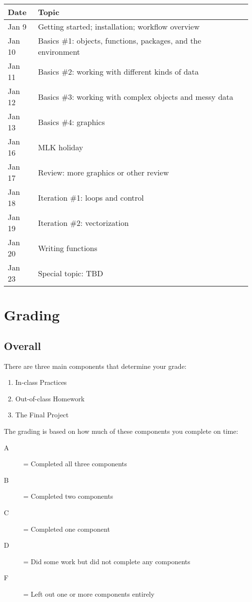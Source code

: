 \documentclass{tufte-handout}
\begin{document}
\begin{center}
\begin{tabular}{ll}
Date & Topic\\
\hline
Jan 9 & Getting started; installation; workflow overview\\
Jan 10 & Basics \#1: objects, functions, packages, and the environment\\
Jan 11 & Basics \#2: working with different kinds of data\\
Jan 12 & Basics \#3: working with complex objects and messy data\\
Jan 13 & Basics \#4: graphics\\
Jan 16 & MLK holiday\\
Jan 17 & Review: more graphics or other review\\
Jan 18 & Iteration \#1: loops and control\\
Jan 19 & Iteration \#2: vectorization\\
Jan 20 & Writing functions\\
Jan 23 & Special topic: TBD\\
\end{tabular}
\end{center}

\section*{Grading}
\label{sec:orgheadline10}
\subsection*{Overall}
\label{sec:orgheadline6}
There are three main components that determine your grade:
\begin{enumerate}
\item In-class Practices
\item Out-of-class Homework
\item The Final Project
\end{enumerate}

The grading is based on how much of these components you complete on time:
\begin{description}
\item[{A}] = Completed all three components
\item[{B}] = Completed two components
\item[{C}] = Completed one component
\item[{D}] = Did some work but did not complete any components
\item[{F}] = Left out one or more components entirely
\end{description}
\end{document}
